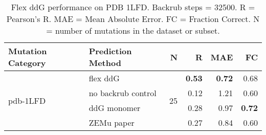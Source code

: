 \begin{table}
  \begin{tabular}{llrrrr}
\toprule
Mutation Category &   Prediction Method &   N &    R &  MAE &   FC \\
\midrule
 \multirow{ 4}{*}{pdb-1LFD} & flex ddG & \multirow{ 4}{*}{25} & \textbf{0.53} & \textbf{0.72} & 0.68  \\
 & no backrub control & & 0.12 & 1.21 & 0.60  \\
 & ddG monomer & & 0.28 & 0.97 & \textbf{0.72}  \\
 & ZEMu paper & & 0.27 & 0.84 & 0.60  \\
\bottomrule
\end{tabular}
  \caption[Flex ddG performance on PDB 1LFD]{
    Flex ddG performance on PDB 1LFD. Backrub steps = 32500. R = Pearson's R. MAE = Mean Absolute Error. FC = Fraction Correct. N = number of mutations in the dataset or subset.
  } \label{tab:table-pdb-1LFD}
\end{table}
